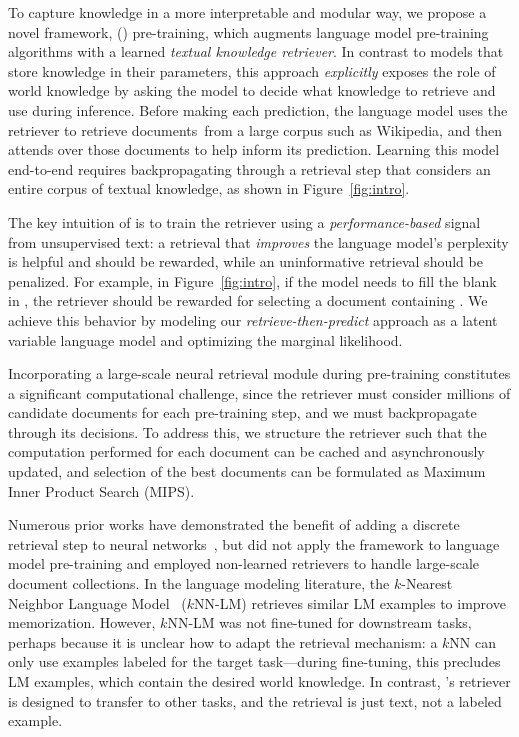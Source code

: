 To capture knowledge in a more interpretable and modular way, we propose a novel framework, \thefullname (\thename) pre-training, which augments language model pre-training algorithms with a learned {\em textual knowledge retriever}.
In contrast to models that store knowledge in their parameters, this approach \emph{explicitly} exposes the role of world knowledge by asking the model to decide what knowledge to retrieve and use during inference.
Before making each prediction, the language model uses the retriever to retrieve documents\footnotemark~from a large corpus such as Wikipedia,
and then attends over those documents to help inform its prediction.
Learning this model end-to-end requires backpropagating through a retrieval step that considers an entire corpus of textual knowledge, as shown in Figure~\ref{fig:intro}.

The key intuition of \thename is to
train the retriever using a {\em performance-based} signal from unsupervised text:
a retrieval that {\em improves} the language model's perplexity is helpful and should be rewarded, while an uninformative retrieval should be penalized. 
For example, in Figure~\ref{fig:intro}, if the model needs to fill the blank in , the retriever should be rewarded for selecting a document containing . We achieve this behavior by modeling our {\em retrieve-then-predict} approach as a latent variable language model and optimizing the marginal likelihood.

Incorporating a large-scale neural retrieval module
during pre-training constitutes a significant computational challenge, %
since the retriever must consider millions of candidate documents for each pre-training step, and we must backpropagate through its decisions. To address this, we structure the retriever such that the computation performed for each document can be cached and asynchronously updated, and selection of the best documents can be formulated as Maximum Inner Product Search (MIPS).

Numerous prior works have
demonstrated the benefit of adding a discrete retrieval step to neural networks~\cite{key_value_memorynetwork, drqa}, but did not apply the framework
to language model pre-training and employed non-learned retrievers to handle large-scale document collections.
In the language modeling literature, the $k$-Nearest Neighbor Language Model~\cite{knnlm} ($k$NN-LM) retrieves similar LM examples to improve memorization. However, $k$NN-LM was not fine-tuned for downstream tasks, perhaps because it is unclear how to adapt the retrieval mechanism: a $k$NN can only use examples labeled for the target task---during fine-tuning, this precludes LM examples, which contain the desired world knowledge. In contrast, \thename's retriever is designed to transfer to other tasks, and the retrieval is just text, not a labeled example.

